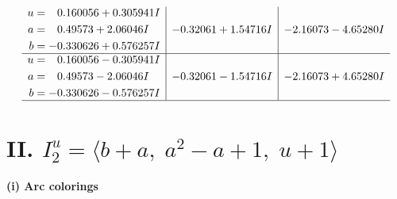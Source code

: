 \documentclass[1p]{elsarticle_modified}
\theoremstyle{definition}
\begin{document}
$$\begin{array}{c|c|c}
\begin{aligned}
u &= \phantom{-}0.160056 + 0.305941 I \\
a &= \phantom{-}0.49573 + 2.06046 I \\
b &= -0.330626 + 0.576257 I\end{aligned}
 & -0.32061 + 1.54716 I & -2.16073 - 4.65280 I \\ \hline\begin{aligned}
u &= \phantom{-}0.160056 - 0.305941 I \\
a &= \phantom{-}0.49573 - 2.06046 I \\
b &= -0.330626 - 0.576257 I\end{aligned}
 & -0.32061 - 1.54716 I & -2.16073 + 4.65280 I\\
 \hline 
 \end{array}$$\newpage\newpage\renewcommand{\arraystretch}{1}
\centering \section*{II. $I^u_{2}= \langle b+a,\;a^2- a+1,\;u+1 \rangle$}
\flushleft \textbf{(i) Arc colorings}\\
\end{document}
